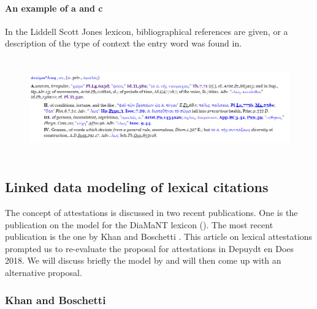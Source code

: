 \documentclass[10pt]{article}
\begin{document}
\paragraph*{An example of a and c}

 In the Liddell Scott Jones lexicon, bibliographical references are given, or a description of the type of context the entry word was found in.

\begin{figure}[H]
\advance\leftskip 0.12in		\includegraphics[width=6.27in,height=1.69in]{./image14.png}
\end{figure}

\par

\subsection{Linked data modeling of lexical citations}


The concept of attestations is discussed in two recent publications. One is the publication on the model for the DiaMaNT lexicon (\cite{DEPUYDT18.25}). The most recent publication is the one by Khan and Boschetti \cite{KhanBoschetti}.  This article on lexical attestations prompted us to re-evaluate the proposal for attestations in Depuydt en Does 2018. We will discuss briefly the model by \cite{KhanBoschetti} and will then come up with an alternative proposal.



\subsubsection*{Khan and Boschetti}
\end{document}
